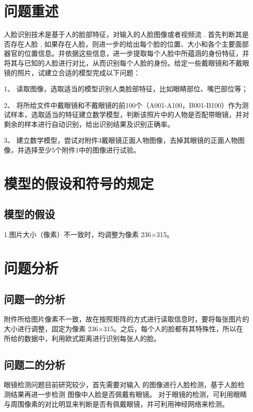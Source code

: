 \documentclass[12pt]{article}
\begin{document}
   {
        {\centering\section{问题重述}}
       {人脸识别技术是基于人的脸部特征，对输入的人脸图像或者视频流 . 首先判断其是否存在人脸 , 如果存在人脸，则进一步的给出每个脸的位置、大小和各个主要面部器官的位置信息。并依据这些信息，进一步提取每个人脸中所蕴涵的身份特征，并将其与已知的人脸进行对比，从而识别每个人脸的身份。给定一些戴眼镜和不戴眼镜的照片，试建立合适的模型完成以下问题：
       \par 1、	读取图像，选取适当的模型识别人类脸部特征，比如眼睛部位、嘴巴部位等；
       \par 2、	将所给文件中戴眼镜和不戴眼镜的前100个（A001-A100，B001-B100）作为测试样本，选取适当的特征建立数学模型，判断该照片中的人物是否配带眼镜，并对剩余的样本进行自动识别，给出识别结果及识别正确率。 
       \par3、	建立数学模型，尝试对附件3戴眼镜正面人物图像，去掉其眼镜的正面人物图像，并选择至少5个附件1中的图像进行试验。
       }

       {\centering\section{模型的假设和符号的规定}}
       \subsection{模型的假设}
       \par 1.图片大小（像素）不一致时，均调整为像素 236×315。


       
       {\centering\section{问题分析}}%
       \subsection{问题一的分析}
       附件所给图片像素不一致，故在按照矩阵的方式进行读取信息时，要将每张图片的大小进行调整，固定为像素 236×315。之后，每个人的脸都有其特殊性，所以在所给的数据中，利用欧式距离进行识别每张人的脸。
      
       \subsection{问题二的分析}
       眼镜检测问题目前研究较少，首先需要对输入
的图像进行人脸检测，基于人脸检测结果再进一步检测
图像中人脸是否佩戴有眼镜。
对于眼镜的检测，可利用眼睛与周围像素的对比明显来判断是否有佩戴眼镜，并可利用神经网络来检测。

}
\end{document}
